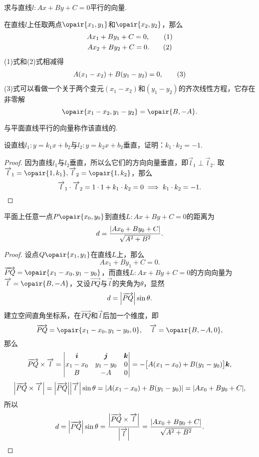 \begin{example}
求与直线\(l: A x + B y + C = 0\)平行的向量.
\begin{solution}
在直线\(l\)上任取两点\(\opair{x_1,y_1}\)和\(\opair{x_2,y_2}\)，那么\begin{gather}
A x_1 + B y_1 + C = 0, \tag1 \\
A x_2 + B y_2 + C = 0. \tag2
\end{gather}
(1)式和(2)式相减得\begin{gather}
A (x_1-x_2) + B (y_1-y_2) = 0, \tag3
\end{gather}
(3)式可以看做一个关于两个变元\((x_1-x_2)\)和\((y_1-y_2)\)的齐次线性方程，它存在非零解\[
\opair{x_1-x_2,y_1-y_2} = \opair{B,-A}.
\]
\end{solution}
\end{example}
与平面直线平行的向量称作该直线的.

\begin{example}
设直线\(l_1: y=k_1 x+b_2\)与\(l_2: y=k_2 x+b_2\)垂直，证明：\(k_1 \cdot k_2 = -1\).
\begin{proof}
因为直线\(l_1\)与\(l_2\)垂直，所以么它们的方向向量垂直，即\(\vec{l}_1 \perp \vec{l}_2\).
取\(\vec{l}_1 = \opair{1,k_1},\vec{l}_2 = \opair{1,k_2}\)，那么\[
\vec{l}_1\cdot\vec{l}_2 = 1 \cdot 1 + k_1 \cdot k_2 = 0
\implies
k_1 \cdot k_2 = -1.
\qedhere
\]
\end{proof}
\end{example}

\begin{example}\label{example:解析几何.平面直线外一点到该直线的距离问题}
平面上任意一点\(P\opair{x_0,y_0}\)到直线\(L: Ax+By+C=0\)的距离为\begin{equation}
d = \frac{\abs{A x_0 + B y_0 + C}}{\sqrt{A^2 + B^2}}.
\end{equation}
\begin{proof}
设点\(Q\opair{x_1,y_1}\)在直线\(L\)上，那么\[
A x_1 + B y_1 + C = 0.
\]\(\vec{PQ} = \opair{x_1 - x_0,y_1 - y_0}\)，而直线\(L: Ax+By+C=0\)的方向向量为\(\vec{l} = \opair{B,-A}\)，又设\(\vec{PQ}\)与\(\vec{l}\)的夹角为\(\theta\)，显然\[
d = \abs{\vec{PQ}} \sin\theta.
\]
建立空间直角坐标系，在\(\vec{PQ}\)和\(\vec{l}\)后加一个维度，即\[
\vec{PQ} = \opair{x_1 - x_0,y_1 - y_0,0},
\quad
\vec{l} = \opair{B,-A,0},
\]那么\[
\vec{PQ} \times \vec{l} = \begin{vmatrix}
\mat{i} & \mat{j} & \mat{k} \\
x_1 - x_0 & y_1 - y_0 & 0 \\
B & -A & 0
\end{vmatrix} = -\bigl[A(x_1 - x_0)+B(y_1 - y_0)\bigr] \mat{k},
\]\[
\abs{\vec{PQ} \times \vec{l}}
= \abs{\vec{PQ}} \abs{\vec{l}} \sin\theta
= \abs{A(x_1 - x_0)+B(y_1 - y_0)}
= \abs{A x_0 + B y_0 + C},
\]所以\[
d = \abs{\vec{PQ}} \sin\theta
= \frac{\abs{\vec{PQ} \times \vec{l}}}{\abs{\vec{l}}}
= \frac{\abs{A x_0 + B y_0 + C}}{\sqrt{A^2+B^2}}.
\qedhere
\]
\end{proof}
\end{example}

